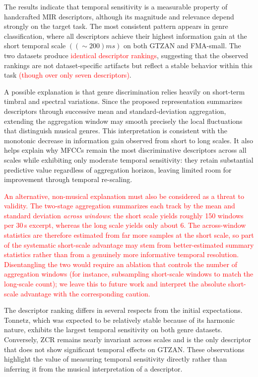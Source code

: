 \documentclass[runningheads]{llncs}
\begin{document}
The results indicate that temporal sensitivity is a measurable property of handcrafted MIR descriptors, although its magnitude and relevance depend strongly on the target task. The most consistent pattern appears in genre classification, where all descriptors achieve their highest information gain at the short temporal scale $((\sim 200) ms)$ on both GTZAN and FMA-small. The two datasets produce \textcolor{red}{identical descriptor rankings}, suggesting that the observed rankings are not dataset-specific artifacts but reflect a stable behavior within this task \textcolor{red}{(though over only seven descriptors)}.

A possible explanation is that genre discrimination relies heavily on short-term timbral and spectral variations. Since the proposed representation summarizes descriptors through successive mean and standard-deviation aggregation, extending the aggregation window may smooth precisely the local fluctuations that distinguish musical genres. This interpretation is consistent with the monotonic decrease in information gain observed from short to long scales. It also helps explain why MFCCs remain the most discriminative descriptors across all scales while exhibiting only moderate temporal sensitivity: they retain substantial predictive value regardless of aggregation horizon, leaving limited room for improvement through temporal re-scaling.

\textcolor{red}{An alternative, non-musical explanation must also be considered as a threat to validity. The two-stage aggregation summarizes each track by the mean and standard deviation \emph{across windows}: the short scale yields roughly 150 windows per 30\,s excerpt, whereas the long scale yields only about 6. The across-window statistics are therefore estimated from far more samples at the short scale, so part of the systematic short-scale advantage may stem from better-estimated summary statistics rather than from a genuinely more informative temporal resolution. Disentangling the two would require an ablation that controls the number of aggregation windows (for instance, subsampling short-scale windows to match the long-scale count); we leave this to future work and interpret the absolute short-scale advantage with the corresponding caution.}

The descriptor ranking differs in several respects from the initial expectations. Tonnetz, which was expected to be relatively stable because of its harmonic nature, exhibits the largest temporal sensitivity on both genre datasets. Conversely, ZCR remains nearly invariant across scales and is the only descriptor that does not show significant temporal effects on GTZAN. These observations highlight the value of measuring temporal sensitivity directly rather than inferring it from the musical interpretation of a descriptor.
\end{document}
